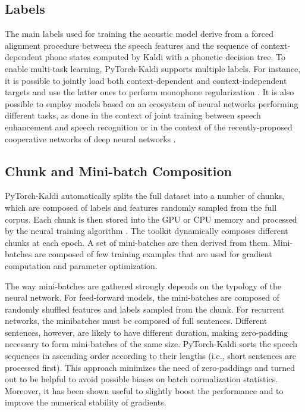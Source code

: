 \documentclass{article}
\begin{document}
\subsection{Labels}
The main labels used for training the acoustic model derive from a forced alignment procedure between the speech features and the sequence of context-dependent phone states computed by Kaldi with a phonetic decision tree. To enable multi-task learning, PyTorch-Kaldi supports multiple labels. For instance, it is possible to jointly load both context-dependent and context-independent targets and use the latter ones to perform monophone regularization \cite{ravanelli15,mono_reg}. It is also possible to employ models based on an ecosystem of neural networks performing different tasks, as done in the context of joint training between speech enhancement and speech recognition \cite{ravanelli_SLT,joint2} or in the context of the recently-proposed cooperative networks of deep neural networks \cite{ravanelli_icassp}.

\subsection{Chunk and Mini-batch Composition}
PyTorch-Kaldi automatically splits the full dataset into a number of chunks, which are composed of labels and features randomly sampled from the full corpus. Each chunk is then stored into the GPU or CPU memory and processed by the neural training algorithm . The toolkit dynamically composes different chunks at each epoch.
A set of mini-batches are then derived from them. Mini-batches are composed of few  training examples that are used for gradient computation and parameter optimization. 

The way mini-batches are gathered strongly depends on the typology of the neural network. 
For feed-forward models, the mini-batches are composed of randomly shuffled features and labels sampled from the chunk. For recurrent networks, the minibatches must be composed of full sentences. Different sentences, however, are likely to have different duration, making zero-padding necessary to form mini-batches of the same size. PyTorch-Kaldi sorts the speech sequences in ascending order according to their lengths (i.e., short sentences are processed first). This approach minimizes the need of zero-paddings and turned out to be helpful to avoid possible biases on batch normalization statistics. Moreover, it has been shown useful to slightly boost the performance and to improve the numerical stability of gradients. 
\end{document}
